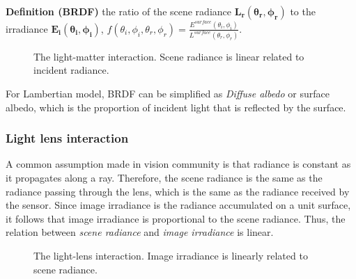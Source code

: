 \noindent\textbf{Definition (BRDF)} the ratio of the scene radiance $\mathbf{L_r(\theta_r, \phi_r)}$ to the irradiance $\mathbf{E_i(\theta_i, \phi_i)}$, \ie $f(\theta_i, \phi_i, \theta_r, \phi_r)=\frac{E^{surface}(\theta_i, \phi_i)}{L^{surface}(\theta_r, \phi_r)}$.
\begin{figure}[!htbp]
\centering
{}
\caption{The light-matter interaction. Scene radiance is linear related to incident radiance.}
\label{fig:light_matter_interact}
\end{figure}

For Lambertian model, BRDF can be simplified as \textit{Diffuse albedo} or surface albedo, which is the proportion of incident light that is reflected by the surface. 

\subsubsection{Light lens interaction}
A common assumption made in vision community is that radiance is constant as it propagates along a ray. Therefore, the scene radiance is the same as the radiance passing through the lens, which is the same as the radiance received by the sensor. Since image irradiance is the radiance accumulated on a unit surface, it follows that image irradiance is proportional to the scene radiance. Thus, the relation between \textit{scene radiance} and \textit{image irradiance} is linear.
\begin{figure}[!ht]
\centering
{}
\caption{The light-lens interaction. Image irradiance is linearly related to scene radiance.}
\label{fig:light_lens_interact}
\end{figure}

